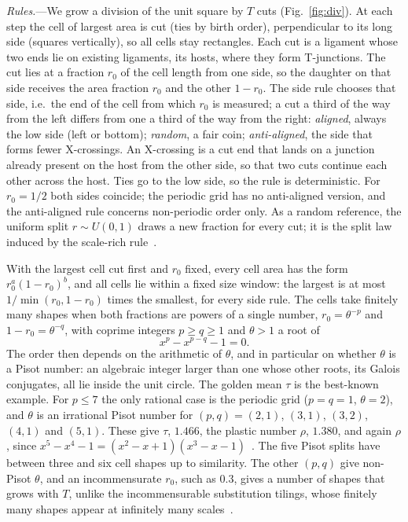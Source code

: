 \documentclass[aps,prl,twocolumn,superscriptaddress,amsmath,amssymb,floatfix]{revtex4-2}
\begin{document}
\textit{Rules.}---We grow a division of the unit square by $T$ cuts (Fig.~\ref{fig:div}). At
each step the cell of largest area is cut (ties by birth order), perpendicular to its long side
(squares vertically), so all cells stay rectangles. Each cut is a ligament whose two ends lie
on existing ligaments, its hosts, where they form T-junctions. The cut lies at a fraction
$r_0$ of the cell length from one side, so the daughter on that side receives the area
fraction $r_0$ and the other $1-r_0$. The side rule chooses that side, i.e.\ the end of the cell from which $r_0$ is measured; a cut
a third of the way from the left differs from one a third of the way from the right:
\emph{aligned}, always the low side (left or bottom);
\emph{random}, a fair coin;
\emph{anti-aligned}, the side that forms fewer X-crossings. An X-crossing is a cut end that
lands on a junction already present on the host from the other side, so that two cuts continue
each other across the host. Ties go to the low side, so the rule is deterministic.
For $r_0=1/2$ both sides coincide; the periodic grid has no anti-aligned version, and the
anti-aligned rule concerns non-periodic order only. As a random reference, the uniform split
$r\sim U(0,1)$ draws a new fraction for every cut; it is the split law induced by the
scale-rich rule~\cite{vazquez2026div}.

With the largest cell cut first and $r_0$ fixed, every cell area has the form
$r_0^{a}(1-r_0)^{b}$, and all cells lie within a fixed size window: the largest is at most
$1/\min(r_0,1-r_0)$ times the smallest, for every side rule. The cells take finitely many
shapes when both fractions are powers of a single number, $r_0=\theta^{-p}$ and
$1-r_0=\theta^{-q}$, with coprime integers $p\ge q\ge1$ and $\theta>1$ a root of
\begin{equation}
x^{p}-x^{p-q}-1=0 .
\label{eq:theta}
\end{equation}
The order then depends on the arithmetic of $\theta$, and in particular on whether $\theta$ is
a Pisot number: an algebraic integer larger than one whose other roots, its Galois conjugates,
all lie inside the unit circle. The golden mean $\tau$ is the best-known example. For $p\le7$
the only rational case is the periodic grid ($p=q=1$, $\theta=2$), and $\theta$ is an
irrational Pisot number for $(p,q)=(2,1)$, $(3,1)$, $(3,2)$, $(4,1)$ and $(5,1)$. These give
$\tau$, $1.466$, the plastic number $\rho$, $1.380$, and again $\rho$, since
$x^{5}-x^{4}-1=(x^{2}-x+1)(x^{3}-x-1)$~\cite{siegel1944}. The five Pisot splits have between
three and six cell shapes up to similarity. The other $(p,q)$ give non-Pisot $\theta$, and an
incommensurate $r_0$, such as $0.3$, gives a number of shapes that grows with $T$, unlike
the incommensurable substitution tilings, whose finitely many shapes appear at infinitely many
scales~\cite{smilansky2020}.
\end{document}
